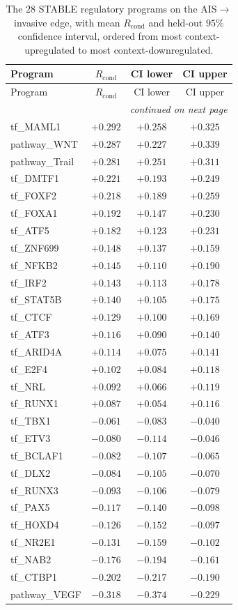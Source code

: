 \begin{longtable}{lccc}
  \caption[STABLE programs, AIS$\rightarrow$invasive]{The $28$ STABLE regulatory programs on the
  AIS$\rightarrow$invasive edge, with mean $R_{\mathrm{cond}}$ and held-out $95\%$ confidence
  interval, ordered from most context-upregulated to most context-downregulated.}
  \label{tab:app-c-stable-inv} \\
  \toprule
  Program & $R_{\mathrm{cond}}$ & CI lower & CI upper \\
  \midrule
  \endfirsthead
  \toprule
  Program & $R_{\mathrm{cond}}$ & CI lower & CI upper \\
  \midrule
  \endhead
  \midrule \multicolumn{4}{r}{\emph{continued on next page}} \\
  \endfoot
  \bottomrule
  \endlastfoot
  tf\_MAML1 & $+0.292$ & $+0.258$ & $+0.325$ \\
  pathway\_WNT & $+0.287$ & $+0.227$ & $+0.339$ \\
  pathway\_Trail & $+0.281$ & $+0.251$ & $+0.311$ \\
  tf\_DMTF1 & $+0.221$ & $+0.193$ & $+0.249$ \\
  tf\_FOXF2 & $+0.218$ & $+0.189$ & $+0.259$ \\
  tf\_FOXA1 & $+0.192$ & $+0.147$ & $+0.230$ \\
  tf\_ATF5 & $+0.182$ & $+0.123$ & $+0.231$ \\
  tf\_ZNF699 & $+0.148$ & $+0.137$ & $+0.159$ \\
  tf\_NFKB2 & $+0.145$ & $+0.110$ & $+0.190$ \\
  tf\_IRF2 & $+0.143$ & $+0.113$ & $+0.178$ \\
  tf\_STAT5B & $+0.140$ & $+0.105$ & $+0.175$ \\
  tf\_CTCF & $+0.129$ & $+0.100$ & $+0.169$ \\
  tf\_ATF3 & $+0.116$ & $+0.090$ & $+0.140$ \\
  tf\_ARID4A & $+0.114$ & $+0.075$ & $+0.141$ \\
  tf\_E2F4 & $+0.102$ & $+0.084$ & $+0.118$ \\
  tf\_NRL & $+0.092$ & $+0.066$ & $+0.119$ \\
  tf\_RUNX1 & $+0.087$ & $+0.054$ & $+0.116$ \\
  tf\_TBX1 & $-0.061$ & $-0.083$ & $-0.040$ \\
  tf\_ETV3 & $-0.080$ & $-0.114$ & $-0.046$ \\
  tf\_BCLAF1 & $-0.082$ & $-0.107$ & $-0.065$ \\
  tf\_DLX2 & $-0.084$ & $-0.105$ & $-0.070$ \\
  tf\_RUNX3 & $-0.093$ & $-0.106$ & $-0.079$ \\
  tf\_PAX5 & $-0.117$ & $-0.140$ & $-0.098$ \\
  tf\_HOXD4 & $-0.126$ & $-0.152$ & $-0.097$ \\
  tf\_NR2E1 & $-0.131$ & $-0.159$ & $-0.102$ \\
  tf\_NAB2 & $-0.176$ & $-0.194$ & $-0.161$ \\
  tf\_CTBP1 & $-0.202$ & $-0.217$ & $-0.190$ \\
  pathway\_VEGF & $-0.318$ & $-0.374$ & $-0.229$ \\
\end{longtable}

